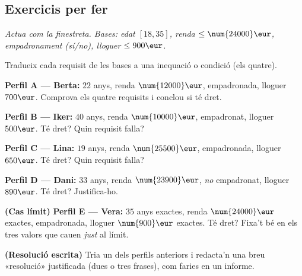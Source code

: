 \subsection{Exercicis per fer}

\noindent\textit{Actua com la finestreta. Bases: edat $[18,35]$, renda
$\le\num{24000}\eur$, empadronament (sí/no), lloguer $\le 900\eur$.}

\begin{exercicis}
\begin{exlist}
  \item Tradueix cada requisit de les bases a una inequació o condició (els quatre).
  \item \textbf{Perfil A — Berta:} $22$ anys, renda $\num{12000}\eur$, empadronada,
        lloguer $700\eur$. Comprova els quatre requisits i conclou si té dret.
  \item \textbf{Perfil B — Iker:} $40$ anys, renda $\num{10000}\eur$, empadronat,
        lloguer $500\eur$. Té dret? Quin requisit falla?
  \item \textbf{Perfil C — Lina:} $19$ anys, renda $\num{25500}\eur$, empadronada,
        lloguer $650\eur$. Té dret? Quin requisit falla?
  \item \textbf{Perfil D — Dani:} $33$ anys, renda $\num{23900}\eur$, \emph{no}
        empadronat, lloguer $890\eur$. Té dret? Justifica-ho.
  \item \textbf{(Cas límit)} \textbf{Perfil E — Vera:} $35$ anys exactes, renda
        $\num{24000}\eur$ exactes, empadronada, lloguer $\num{900}\eur$ exactes. Té
        dret? Fixa't bé en els tres valors que cauen \emph{just} al límit.
  \item \textbf{(Resolució escrita)} Tria un dels perfils anteriors i redacta'n una
        breu «resolució» justificada (dues o tres frases), com faries en un informe.
\end{exlist}
\end{exercicis}

